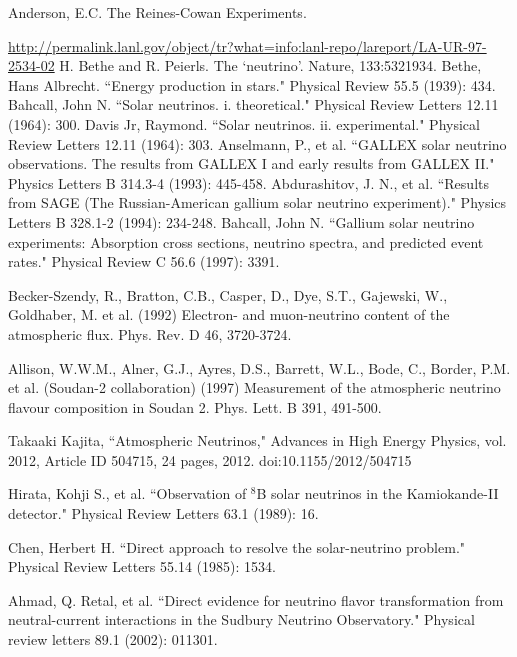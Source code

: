 \documentclass[preprint,12pt]{elsarticle}
\numberwithin{equation}{section}
\begin{document}
\begin{thebibliography}{00}
	 Anderson, E.C. The Reines-Cowan Experiments. 
	
	\url{http://permalink.lanl.gov/object/tr?what=info:lanl-repo/lareport/LA-UR-97-2534-02}
	 H. Bethe and R. Peierls. The `neutrino'. Nature, 133:5321934.
	 Bethe, Hans Albrecht. ``Energy production in stars." Physical Review 55.5 (1939): 434.
	 Bahcall, John N. ``Solar neutrinos. i. theoretical." Physical Review Letters 12.11 (1964): 300.
	 Davis Jr, Raymond. ``Solar neutrinos. ii. experimental." Physical Review Letters 12.11 (1964): 303.
	 Anselmann, P., et al. ``GALLEX solar neutrino observations. The results from GALLEX I and early results from GALLEX II." Physics Letters B 314.3-4 (1993): 445-458.
	 Abdurashitov, J. N., et al. ``Results from SAGE (The Russian-American gallium solar neutrino experiment)." Physics Letters B 328.1-2 (1994): 234-248.
	 Bahcall, John N. ``Gallium solar neutrino experiments: Absorption cross sections, neutrino spectra, and predicted event rates." Physical Review C 56.6 (1997): 3391.
	
	 Becker-Szendy, R., Bratton, C.B., Casper, D., Dye, S.T., Gajewski, W., Goldhaber, M. et al. (1992) Electron- and muon-neutrino content of the atmospheric flux. Phys. Rev. D 46, 3720-3724.
	
	 Allison, W.W.M., Alner, G.J., Ayres, D.S., Barrett, W.L., Bode, C., Border, P.M. et al. (Soudan-2 collaboration) (1997) Measurement of the atmospheric neutrino flavour composition in Soudan 2. Phys. Lett. B 391, 491-500.
	
	 Takaaki Kajita, ``Atmospheric Neutrinos," Advances in High Energy Physics, vol. 2012, Article ID 504715, 24 pages, 2012. doi:10.1155/2012/504715
	
	 Hirata, Kohji S., et al. ``Observation of $^8$B solar neutrinos in the Kamiokande-II detector." Physical Review Letters 63.1 (1989): 16.
	
	 Chen, Herbert H. ``Direct approach to resolve the solar-neutrino problem." Physical Review Letters 55.14 (1985): 1534.
	
	 Ahmad, Q. Retal, et al. ``Direct evidence for neutrino flavor transformation from neutral-current interactions in the Sudbury Neutrino Observatory." Physical review letters 89.1 (2002): 011301.
	

\end{thebibliography}
\end{document}
